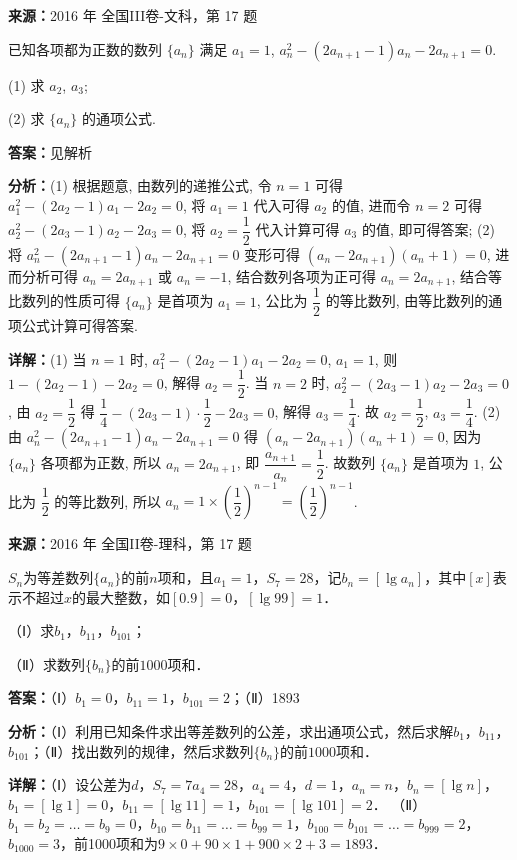 \begin{question}[points=12]
\textbf{来源：}2016 年 全国III卷-文科，第 17 题\par
已知各项都为正数的数列 $\{a_n\}$ 满足 $a_1=1$, $a_n^2-(2a_{n+1}-1)a_n-2a_{n+1}=0$. 

(1) 求 $a_2$, $a_3$; 

(2) 求 $\{a_n\}$ 的通项公式.
\begin{solution}
\textbf{答案：}见解析

\textbf{分析：}(1) 根据题意, 由数列的递推公式, 令 $n=1$ 可得 $a_1^2-(2a_2-1)a_1-2a_2=0$, 将 $a_1=1$ 代入可得 $a_2$ 的值, 进而令 $n=2$ 可得 $a_2^2-(2a_3-1)a_2-2a_3=0$, 将 $a_2=\dfrac{1}{2}$ 代入计算可得 $a_3$ 的值, 即可得答案; (2) 将 $a_n^2-(2a_{n+1}-1)a_n-2a_{n+1}=0$ 变形可得 $(a_n-2a_{n+1})(a_n+1)=0$, 进而分析可得 $a_n=2a_{n+1}$ 或 $a_n=-1$, 结合数列各项为正可得 $a_n=2a_{n+1}$, 结合等比数列的性质可得 $\{a_n\}$ 是首项为 $a_1=1$, 公比为 $\dfrac{1}{2}$ 的等比数列, 由等比数列的通项公式计算可得答案.

\textbf{详解：}(1) 当 $n=1$ 时, $a_1^2-(2a_2-1)a_1-2a_2=0$, $a_1=1$, 则 $1-(2a_2-1)-2a_2=0$, 解得 $a_2=\dfrac{1}{2}$.
当 $n=2$ 时, $a_2^2-(2a_3-1)a_2-2a_3=0$, 由 $a_2=\dfrac{1}{2}$ 得 $\dfrac{1}{4}-(2a_3-1)\cdot\dfrac{1}{2}-2a_3=0$, 解得 $a_3=\dfrac{1}{4}$.
故 $a_2=\dfrac{1}{2}$, $a_3=\dfrac{1}{4}$.
(2) 由 $a_n^2-(2a_{n+1}-1)a_n-2a_{n+1}=0$ 得 $(a_n-2a_{n+1})(a_n+1)=0$, 因为 $\{a_n\}$ 各项都为正数, 所以 $a_n=2a_{n+1}$, 即 $\dfrac{a_{n+1}}{a_n}=\dfrac{1}{2}$. 故数列 $\{a_n\}$ 是首项为 $1$, 公比为 $\dfrac{1}{2}$ 的等比数列, 所以 $a_n=1\times\left(\dfrac{1}{2}\right)^{n-1}=\left(\dfrac{1}{2}\right)^{n-1}$.
\end{solution}
\end{question}

\begin{question}[points=12]
\textbf{来源：}2016 年 全国II卷-理科，第 17 题\par
$S_n$为等差数列$\{a_n\}$的前$n$项和，且$a_1=1$，$S_7=28$，记$b_n=[\lg a_n]$，其中$[x]$表示不超过$x$的最大整数，如$[0.9]=0$，$[\lg 99]=1$．

（Ⅰ）求$b_1$，$b_{11}$，$b_{101}$；

（Ⅱ）求数列$\{b_n\}$的前$1000$项和．
\begin{solution}
\textbf{答案：}（Ⅰ）$b_1=0$，$b_{11}=1$，$b_{101}=2$；（Ⅱ）1893

\textbf{分析：}（Ⅰ）利用已知条件求出等差数列的公差，求出通项公式，然后求解$b_1$，$b_{11}$，$b_{101}$；（Ⅱ）找出数列的规律，然后求数列$\{b_n\}$的前$1000$项和．

\textbf{详解：}（Ⅰ）设公差为$d$，$S_7=7a_4=28$，$a_4=4$，$d=1$，$a_n=n$，$b_n=[\lg n]$，$b_1=[\lg 1]=0$，$b_{11}=[\lg 11]=1$，$b_{101}=[\lg 101]=2$．
（Ⅱ）$b_1=b_2=\ldots=b_9=0$，$b_{10}=b_{11}=\ldots=b_{99}=1$，$b_{100}=b_{101}=\ldots=b_{999}=2$，$b_{1000}=3$，前1000项和为$9\times0+90\times1+900\times2+3=1893$．
\end{solution}
\end{question}

